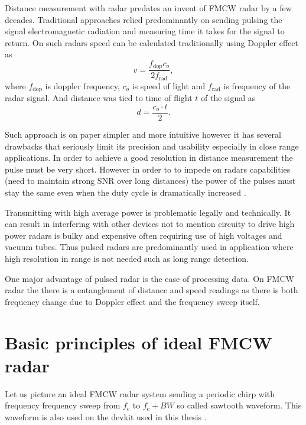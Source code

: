 Distance measurement with radar predates an invent of FMCW radar by a few decades.
Traditional approaches relied predominantly on sending pulsing the signal electromagnetic radiation and measuring time it takes for the signal to return.
On such radars speed can be calculated traditionally using Doppler effect as
\begin{equation}
	v = \frac{f_\mathrm{dop} c_o}{2f_\mathrm{rad}},
	\label{eq:dopler}
\end{equation}
where $f_\mathrm{dop}$ is doppler frequency, $c_o$ is speed of light and $f_\mathrm{rad}$ is frequency of the radar signal.
And distance was tied to time of flight $t$ of the signal as
\begin{equation}
	d = \frac{c_o \cdot t}{2}.
	\label{eq:distance}
\end{equation}

Such approach is on paper simpler and more intuitive however it has several drawbacks that seriously limit its precision and usability especially in close range applications.
In order to achieve a good resolution in distance measurement the pulse must be very short.
However in order to to impede on radars capabilities (need to maintain strong SNR over long distances) the power of the pulses must stay the same even when the duty cycle is dramatically increased \cite{jankiraman2018}.

Transmitting with high average power is problematic legally and technically.
It can result in interfering with other devices not to mention circuity to drive high power radars is bulky and expensive often requiring use of high voltages and vacuum tubes.
Thus pulsed radars are predominantly used in application where high resolution in range is not needed such as long range detection.

One major advantage of pulsed radar is the ease of processing data.
On FMCW radar the there is a entanglement of distance and speed readings as there is both frequency change due to Doppler effect and the frequency sweep itself.

\section{Basic principles of ideal FMCW radar}

Let us picture an ideal FMCW radar system sending a periodic chirp with frequency frequency sweep from $f_\mathrm{c}$ to $f_\mathrm{c}+BW$ so called sawtooth waveform.
This waveform is also used on the devkit used in this thesis \cite{sidarMAN}.

